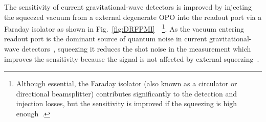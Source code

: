 The sensitivity of current gravitational-wave detectors is improved by injecting the squeezed vacuum from a external degenerate OPO into the readout port via a Faraday isolator as shown in Fig.~\ref{fig:DRFPMI}~\cite{}~\footnote{Although essential, the Faraday isolator (also known as a circulator or directional beamsplitter) contributes significantly to the detection and injection losses, but the sensitivity is improved if the squeezing is high enough~\cite{}.}.
As the vacuum entering readout port is the dominant source of quantum noise in current gravitational-wave detectors~\cite{}, squeezing it reduces the shot noise in the measurement which improves the sensitivity because the signal is not affected by external squeezing~\cite{}.
